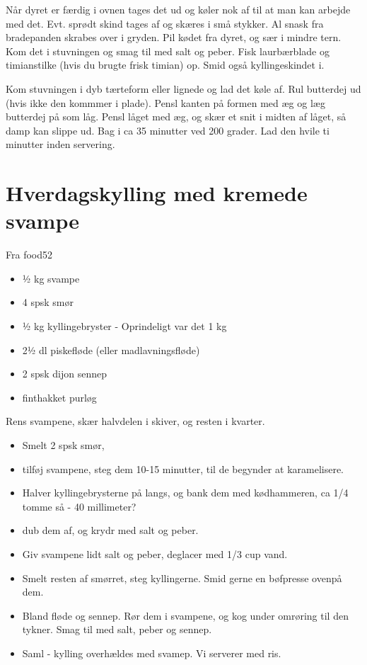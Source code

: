 \documentclass[
]{book}
\providecommand{\tightlist}{%
  \setlength{\itemsep}{0pt}\setlength{\parskip}{0pt}}
\begin{document}
Når dyret er færdig i ovnen tages det ud og køler nok af til at man kan arbejde
med det. Evt. sprødt skind tages af og skæres i små stykker.
Al snask fra bradepanden skrabes over i gryden.
Pil kødet fra dyret, og sær i mindre tern. Kom det i stuvningen og smag til med
salt og peber. Fisk laurbærblade og timianstilke (hvis du brugte frisk timian)
op. Smid også kyllingeskindet i.

Kom stuvningen i dyb tærteform eller lignede og lad det køle af.
Rul butterdej ud (hvis ikke den kommmer i plade). Pensl kanten på formen med æg
og læg butterdej på som låg. Pensl låget med æg, og skær et snit i midten af
låget, så damp kan slippe ud. Bag i ca 35 minutter ved 200 grader. Lad
den hvile ti minutter inden servering.

\hypertarget{hverdagskylling-med-kremede-svampe}{%
\section{Hverdagskylling med kremede svampe}\label{hverdagskylling-med-kremede-svampe}}

Fra food52

\begin{itemize}
\tightlist
\item
  ½ kg svampe
\item
  4 spsk smør
\item
  ½ kg kyllingebryster - Oprindeligt var det 1 kg
\item
  2½ dl piskefløde (eller madlavningsfløde)
\item
  2 spsk dijon sennep
\item
  finthakket purløg
\end{itemize}

Rens svampene, skær halvdelen i skiver, og resten i kvarter.

\begin{itemize}
\tightlist
\item
  Smelt 2 spsk smør,
\item
  tilføj svampene, steg dem 10-15 minutter, til
  de begynder at karamelisere.
\item
  Halver kyllingebrysterne på langs,
  og bank dem med kødhammeren, ca 1/4 tomme så - 40 millimeter?
\item
  dub dem af, og krydr med salt og peber.
\item
  Giv svampene lidt salt og peber, deglacer med 1/3 cup vand.
\item
  Smelt resten af smørret, steg kyllingerne. Smid gerne en
  bøfpresse ovenpå dem.
\item
  Bland fløde og sennep. Rør dem i svampene, og kog under omrøring
  til den tykner. Smag til med salt, peber og sennep.
\item
  Saml - kylling overhældes med svamep. Vi serverer med ris.
\end{itemize}
\end{document}
